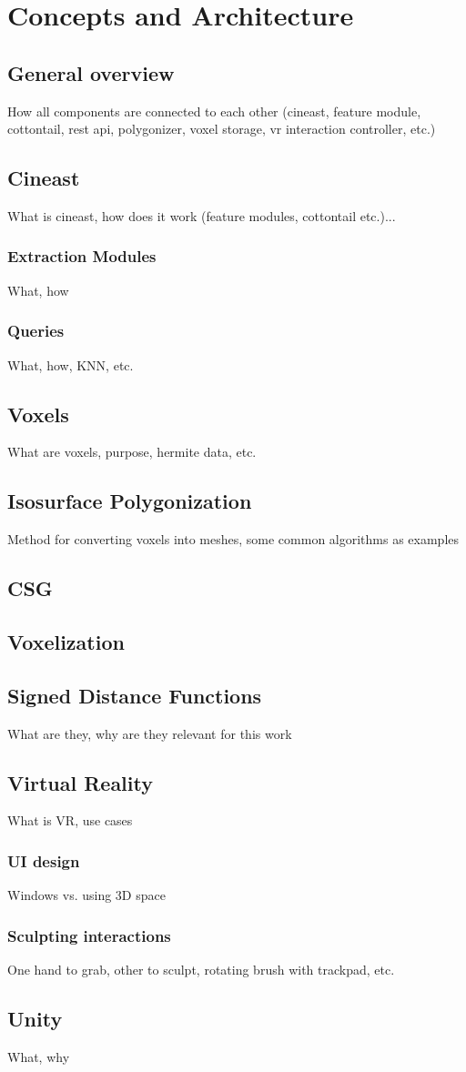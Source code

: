 \chapter{Concepts and Architecture}

\section{General overview}
How all components are connected to each other (cineast, feature module, cottontail, rest api, polygonizer, voxel storage, vr interaction controller, etc.)

\section{Cineast}
What is cineast, how does it work (feature modules, cottontail etc.)...

\subsection{Extraction Modules}
What, how

\subsection{Queries}
What, how, KNN, etc.

\section{Voxels}
What are voxels, purpose, hermite data, etc.

\section{Isosurface Polygonization}
Method for converting voxels into meshes, some common algorithms as examples

\section{CSG}

\section{Voxelization}

\section{Signed Distance Functions}
What are they, why are they relevant for this work

\section{Virtual Reality}
What is VR, use cases

\subsection{UI design}
Windows vs. using 3D space

\subsection{Sculpting interactions}
One hand to grab, other to sculpt, rotating brush with trackpad, etc.

\section{Unity}
What, why
